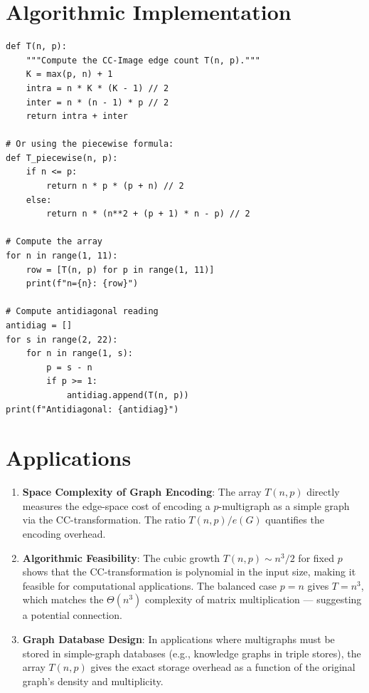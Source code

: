 \documentclass[11pt,a4paper]{article}
\theoremstyle{definition}
\begin{document}
\section{Algorithmic Implementation}

\begin{verbatim}
def T(n, p):
    """Compute the CC-Image edge count T(n, p)."""
    K = max(p, n) + 1
    intra = n * K * (K - 1) // 2
    inter = n * (n - 1) * p // 2
    return intra + inter

# Or using the piecewise formula:
def T_piecewise(n, p):
    if n <= p:
        return n * p * (p + n) // 2
    else:
        return n * (n**2 + (p + 1) * n - p) // 2

# Compute the array
for n in range(1, 11):
    row = [T(n, p) for p in range(1, 11)]
    print(f"n={n}: {row}")

# Compute antidiagonal reading
antidiag = []
for s in range(2, 22):
    for n in range(1, s):
        p = s - n
        if p >= 1:
            antidiag.append(T(n, p))
print(f"Antidiagonal: {antidiag}")
\end{verbatim}

\section{Applications}

\begin{enumerate}
\item \textbf{Space Complexity of Graph Encoding}: The array $T(n, p)$ directly measures the edge-space cost of encoding a $p$-multigraph as a simple graph via the CC-transformation. The ratio $T(n, p) / e(G)$ quantifies the encoding overhead.

\item \textbf{Algorithmic Feasibility}: The cubic growth $T(n, p) \sim n^3/2$ for fixed $p$ shows that the CC-transformation is polynomial in the input size, making it feasible for computational applications. The balanced case $p = n$ gives $T = n^3$, which matches the $\Theta(n^3)$ complexity of matrix multiplication --- suggesting a potential connection.

\item \textbf{Graph Database Design}: In applications where multigraphs must be stored in simple-graph databases (e.g., knowledge graphs in triple stores), the array $T(n, p)$ gives the exact storage overhead as a function of the original graph's density and multiplicity.
\end{enumerate}
\end{document}
